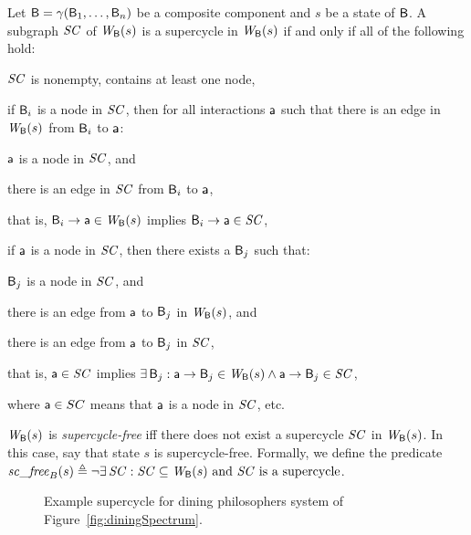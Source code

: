 \bd[Supercycle]
\label{def:supercycle}
Let $\mathsf{B} = \gamma(\mathsf{B}_1,\dots,\mathsf{B}_n)$ be a composite component and $s$ be a state of $\mathsf{B}$.
A subgraph $\mathit{SC}$ of $\mathit{W}_{\mathsf{B}}({s})$ is a supercycle in $\mathit{W}_{\mathsf{B}}({s})$ if and only if all of the following hold:
\begin{nlst1}
   \item \label{def:supercycle.nonempty} $\mathit{SC}$ is nonempty, \ie contains at least one node,

   \item \label{def:supercycle.component-blocked} if $\mathsf{B}_i$ is a node in $\mathit{SC}$, then for all interactions $\mathsf{a}$ such that
there is an edge in $\mathit{W}_{\mathsf{B}}({s})$ from $\mathsf{B}_i$ to $\mathsf{a}$:
      \begin{nlst2}
      \item $\mathsf{a}$ is a node in $\mathit{SC}$, and 
      \item there is an edge in $\mathit{SC}$ from $\mathsf{B}_i$ to $\mathsf{a}$,
      \end{nlst2}
that is, $\mathsf{B}_i \rightarrow \mathsf{a} \in \mathit{W}_{\mathsf{B}}({s})$ implies $\mathsf{B}_i \rightarrow \mathsf{a} \in \mathit{SC}$,

   \item \label{def:supercycle.action-blocked}  
if $\mathsf{a}$ is a node in $\mathit{SC}$, then there exists a $\mathsf{B}_j$ such that:
      \begin{nlst2}
      \item $\mathsf{B}_j$  is a node in $\mathit{SC}$, and
      \item there is an edge from $\mathsf{a}$ to $\mathsf{B}_j$ in $\mathit{W}_{\mathsf{B}}({s})$, and
      \item there is an edge from $\mathsf{a}$ to $\mathsf{B}_j$ in $\mathit{SC}$,
      \end{nlst2}
that is, $\mathsf{a} \in \mathit{SC}$ implies $\exists\, \mathsf{B}_j : \mathsf{a} \rightarrow \mathsf{B}_j \in \mathit{W}_{\mathsf{B}}({s}) \land \mathsf{a} \rightarrow \mathsf{B}_j \in \mathit{SC}$,

\end{nlst1}
\ed
where $\mathsf{a} \in SC$ means that $\mathsf{a}$ is a node in $\mathit{SC}$, etc. 

\label{def:supercycle-free}
$\mathit{W}_{\mathsf{B}}({s})$ is \emph{supercycle-free} iff 
there does not exist a supercycle $\mathit{SC}$ in $\mathit{W}_{\mathsf{B}}({s})$. 
In this case, say that state $s$ is supercycle-free.
Formally, we define the predicate 
    $\scf{B}{s} \df \neg \ex \SC: \SC \sub \wfg{\B}{s} \ \mbox{and $\SC$ is a supercycle}$. 
\ed

\begin{figure*}[ht]
  \begin{center}
   \scalebox{0.4}{}
   \caption{Example supercycle for dining philosophers system of Figure~\ref{fig:diningSpectrum}.}
   \label{fig:sc}
  \end{center}
\end{figure*}


